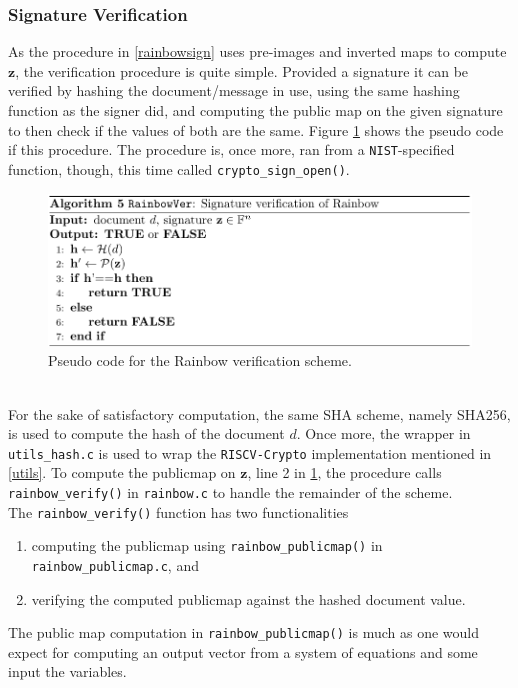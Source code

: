 \subsubsection{Signature Verification} \label{section:message_verif}
As the procedure in \cref{rainbowsign} uses pre-images and inverted maps to compute $\textbf{z}$, the verification procedure is quite simple. Provided a signature it can be verified by hashing the document/message in use, using the same hashing function as the signer did, and computing the public map on the given signature to then check if the values of both are the same. Figure \ref{rainbowveri} shows the pseudo code if this procedure. The procedure is, once more, ran from a \texttt{NIST}-specified function, though, this time called \texttt{crypto\_sign\_open()}. 
\begin{figure}[t]
    \centering
    \includegraphics[width=\textwidth]{resources/rainbowver.png}
    \caption{Pseudo code for the Rainbow verification scheme.}
    \label{rainbowveri}
\end{figure}\\
For the sake of satisfactory computation, the same SHA scheme, namely SHA256, is used to compute the hash of the document $d$. Once more, the wrapper in \texttt{utils\_hash.c} is used to wrap the \texttt{RISCV-Crypto} implementation mentioned in \cref{utils}. To compute the publicmap on $\textbf{z}$, line 2 in \cref{rainbowveri}, the procedure calls \texttt{rainbow\_verify()} in \texttt{rainbow.c} to handle the remainder of the scheme.\medskip\\
The \texttt{rainbow\_verify()} function has two functionalities
\begin{enumerate}
    \item computing the publicmap using \texttt{rainbow\_publicmap()} in\\ \texttt{rainbow\_publicmap.c}, and
    \item verifying the computed publicmap against the hashed document value.
\end{enumerate}
The public map computation in \texttt{rainbow\_publicmap()} is much as one would expect for computing an output vector from a system of equations and some input the variables.\medskip\\
